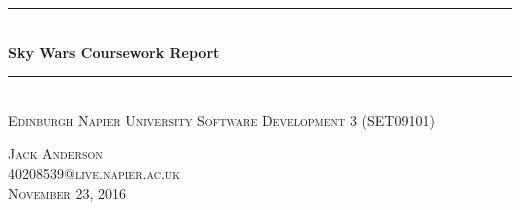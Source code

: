 \documentclass{article}
\begin{document}
	\begin{titlepage}
		\begin{center}
			\rule{12cm}{0.4pt} \\
			[0.25in]
			\huge{\bfseries Sky Wars Coursework Report} \\
			[2mm]
			\rule{12cm}{0.4pt} \\
			[0.25in]
			\textsc{Edinburgh Napier University}
			\textsc{Software Development 3 (SET09101)} \\
			[110mm]
		\end{center} 
		
		\begin{flushright}
				\textsc{\large Jack Anderson \\
				40208539@live.napier.ac.uk \\
				November 23, 2016 \\
				}
			\end{flushright}
	\end{titlepage}

  	
\end{document}
